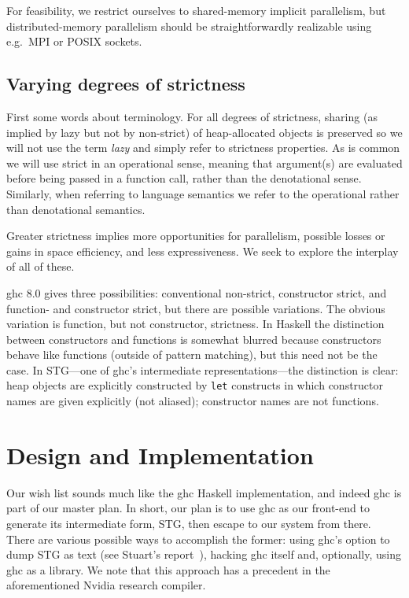 \documentclass{llncs}
\begin{document}
For feasibility, we restrict ourselves to shared-memory implicit parallelism,
but distributed-memory parallelism should be straightforwardly realizable
using e.g.\ MPI or POSIX sockets.

\subsection{Varying degrees of strictness}

First some words about terminology.  For all degrees of strictness, sharing
(as implied by lazy but not by non-strict) of heap-allocated objects is
preserved so we will not use the term \emph{lazy} and simply refer to
strictness properties.  As is common we will use strict in an operational
sense, meaning that argument(s) are evaluated before being passed in a
function call, rather than the denotational sense.  Similarly, when referring
to language semantics we refer to the operational rather than denotational
semantics.

Greater strictness implies more opportunities for parallelism, possible losses
or gains in space efficiency, and less expressiveness.  We seek to explore
the interplay of all of these.

ghc 8.0 gives three possibilities: conventional non-strict, constructor
strict, and function- and constructor strict, but there are possible
variations.  The obvious variation is function, but not constructor,
strictness.  In Haskell the distinction between constructors and functions is
somewhat blurred because constructors behave like functions (outside of
pattern matching), but this need not be the case.  In STG---one of ghc's
intermediate representations---the distinction is clear: heap objects are
explicitly constructed by \texttt{let} constructs in which constructor names
are given explicitly (not aliased); constructor names are not functions.

\section{Design and Implementation}

Our wish list sounds much like the ghc Haskell implementation, and indeed ghc
is part of our master plan.  In short, our plan is to use ghc as our front-end
to generate its intermediate form, STG, then escape to our system from there.
There are various possible ways to accomplish the former: using ghc's option
to dump STG as text (see Stuart's report~\cite{Stuart}), hacking ghc itself
and, optionally, using ghc as a library.  We note that this approach has 
a precedent in the aforementioned Nvidia research compiler.
\end{document}
